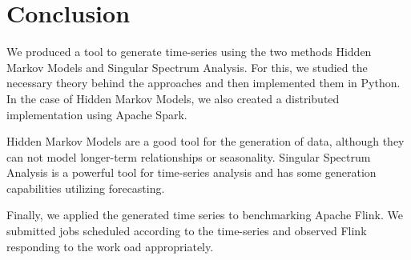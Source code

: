 \chapter{Conclusion}\label{chapter:conclusion}

We produced a tool to generate time-series using the two methods Hidden Markov Models and Singular Spectrum Analysis. For this, we studied the necessary theory behind the approaches and then implemented them in Python. In the case of Hidden Markov Models, we also created a distributed implementation using Apache Spark. 

Hidden Markov Models are a good tool for the generation of data, although they can not model longer-term relationships or seasonality. Singular Spectrum Analysis is a powerful tool for time-series analysis and has some generation capabilities utilizing forecasting. 

Finally, we applied the generated time series to benchmarking Apache Flink. We submitted jobs scheduled according to the time-series and observed Flink responding to the work oad appropriately. 